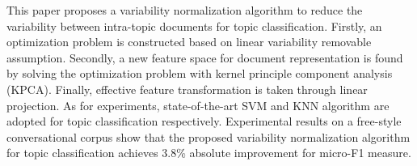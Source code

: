 This paper proposes a variability normalization algorithm to reduce the variability between intra-topic documents for topic classification. Firstly, an optimization problem is constructed based on linear variability removable assumption. Secondly, a new feature space for document representation is found by solving the optimization problem with kernel principle component analysis (KPCA). Finally, effective feature transformation is taken through linear projection. As for experiments, state-of-the-art SVM and KNN algorithm are adopted for topic classification respectively. Experimental results on a free-style conversational corpus show that the proposed variability normalization algorithm for topic classification achieves 3.8\% absolute improvement for micro-F1 measure.
